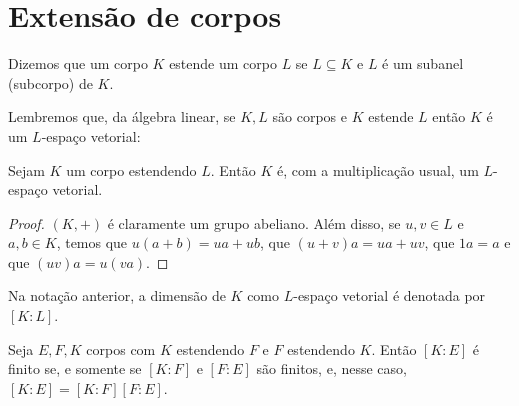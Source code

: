 \chapter{Extensão de corpos}

\begin{definition}
Dizemos que um corpo $K$ estende um corpo $L$ se $L\subseteq K$ e $L$ é um subanel (subcorpo) de $K$.
\end{definition}

Lembremos que, da álgebra linear, se $K, L$ são corpos e $K$ estende $L$ então $K$ é um $L$-espaço vetorial:

\begin{prop}
    Sejam $K$ um corpo estendendo $L$. Então $K$ é, com a multiplicação usual, um $L$-espaço vetorial.
\end{prop}

\begin{proof}
    $(K, +)$ é claramente um grupo abeliano. Além disso, se $u, v \in L$ e $a, b \in K$, temos que $u(a+b)=ua+ub$, que $(u+v)a=ua+uv$, que $1a=a$ e que $(uv)a=u(va)$.
\end{proof}

\begin{definition}
Na notação anterior, a dimensão de $K$ como $L$-espaço vetorial é denotada por $[K:L]$.
\end{definition}

\begin{lemma}
Seja $E, F, K$ corpos com $K$ estendendo $F$ e $F$ estendendo $K$. Então $[K:E]$ é finito se, e somente se $[K:F]$ e $[F:E]$ são finitos, e, nesse caso, $[K:E]=[K:F][F:E]$.
\end{lemma}

